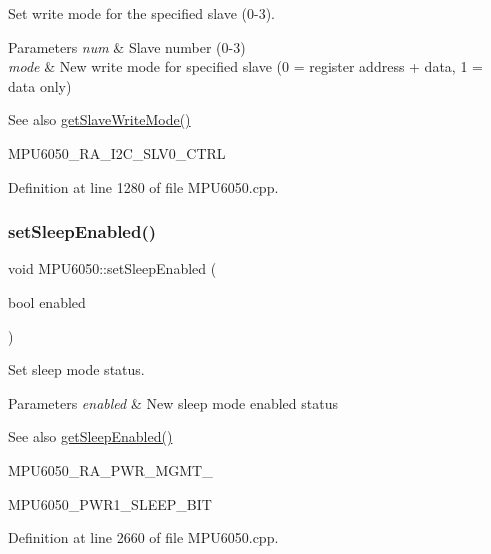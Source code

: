 Set write mode for the specified slave (0-\/3). 


\begin{DoxyParams}{Parameters}
{\em num} & Slave number (0-\/3) \\
\hline
{\em mode} & New write mode for specified slave (0 = register address + data, 1 = data only) \\
\hline
\end{DoxyParams}
\begin{DoxySeeAlso}{See also}
\mbox{\hyperlink{classMPU6050_adb99955fa66300b1f0bedfcdd8187412}{get\+Slave\+Write\+Mode()}} 

M\+P\+U6050\+\_\+\+R\+A\+\_\+\+I2\+C\+\_\+\+S\+L\+V0\+\_\+\+C\+T\+RL 
\end{DoxySeeAlso}


Definition at line 1280 of file M\+P\+U6050.\+cpp.

\mbox{\label{classMPU6050_a15ec5f8e7daf235f507c1d8b96af051a}} 
\subsubsection{\texorpdfstring{setSleepEnabled()}{setSleepEnabled()}}
{\footnotesize\ttfamily void M\+P\+U6050\+::set\+Sleep\+Enabled (\begin{DoxyParamCaption}\item[{bool}]{enabled }\end{DoxyParamCaption})}



Set sleep mode status. 


\begin{DoxyParams}{Parameters}
{\em enabled} & New sleep mode enabled status \\
\hline
\end{DoxyParams}
\begin{DoxySeeAlso}{See also}
\mbox{\hyperlink{classMPU6050_a196404ef04b959083d4bf5e6f1cd8b98}{get\+Sleep\+Enabled()}} 

M\+P\+U6050\+\_\+\+R\+A\+\_\+\+P\+W\+R\+\_\+\+M\+G\+M\+T\+\_ 

M\+P\+U6050\+\_\+\+P\+W\+R1\+\_\+\+S\+L\+E\+E\+P\+\_\+\+B\+IT 
\end{DoxySeeAlso}


Definition at line 2660 of file M\+P\+U6050.\+cpp.

\mbox{\label{classMPU6050_af4df87fd2e87f41d06706cfd5bbc2a2c}} 
